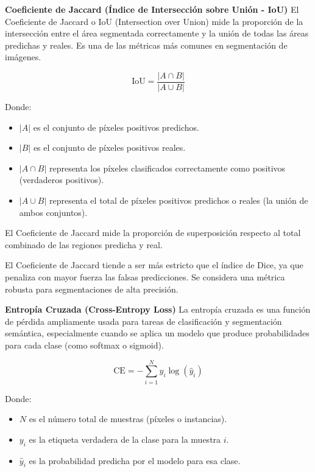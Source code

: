 \textbf{Coeficiente de Jaccard (Índice de Intersección sobre Unión - IoU)}
El Coeficiente de Jaccard o IoU (Intersection over Union) mide la proporción de la intersección entre el área segmentada correctamente y la unión de todas las áreas predichas y reales. Es una de las métricas más comunes en segmentación de imágenes. \parencite{reinke2021common}
        
\begin{equation}
    \text{IoU} = \frac{|A \cap B|}{|A \cup B|}
\end{equation}

\noindent Donde:
\begin{itemize}
    \item $|A|$ es el conjunto de píxeles positivos predichos.
    \item $|B|$ es el conjunto de píxeles positivos reales.
    \item $|A \cap B|$ representa los píxeles clasificados correctamente como positivos (verdaderos positivos).
    \item $|A \cup B|$ representa el total de píxeles positivos predichos o reales (la unión de ambos conjuntos).
\end{itemize}

\noindent El Coeficiente de Jaccard mide la proporción de superposición respecto al total combinado de las regiones predicha y real.
                     
El Coeficiente de Jaccard tiende a ser más estricto que el índice de Dice, ya que penaliza con mayor fuerza las falsas predicciones. Se considera una métrica robusta para segmentaciones de alta precisión. \parencite{reinke2021common}

\textbf{Entropía Cruzada (Cross-Entropy Loss)}
La entropía cruzada es una función de pérdida ampliamente usada para tareas de clasificación y segmentación semántica, especialmente cuando se aplica un modelo que produce probabilidades para cada clase (como softmax o sigmoid). \parencite{goodfellow2016deep}

\begin{equation}
    \text{CE} = -\sum_{i=1}^{N} y_i \log(\hat{y}_i)
\end{equation}

\noindent Donde:
\begin{itemize}
    \item $N$ es el número total de muestras (píxeles o instancias).
    \item $y_i$ es la etiqueta verdadera de la clase para la muestra $i$.
    \item $\hat{y}_i$ es la probabilidad predicha por el modelo para esa clase.
\end{itemize}

